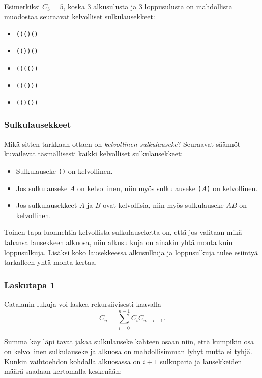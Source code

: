 Esimerkiksi $C_3=5$, koska 3 alkusulusta
ja 3 loppusulusta on mahdollista muodostaa
seuraavat kelvolliset sulkulausekkeet:

\begin{itemize}[noitemsep]
\item \texttt{()()()}
\item \texttt{(())()}
\item \texttt{()(())}
\item \texttt{((()))}
\item \texttt{(()())}
\end{itemize}

\subsubsection{Sulkulausekkeet}


Mikä sitten tarkkaan ottaen on
\textit{kelvollinen sulkulauseke}?
Seuraavat säännöt kuvailevat täsmällisesti
kaikki kelvolliset sulkulausekkeet:

\begin{itemize}
\item Sulkulauseke \texttt{()} on kelvollinen.
\item Jos sulkulauseke $A$ on kelvollinen,
niin myös sulkulauseke \texttt{(}$A$\texttt{)}
on kelvollinen.
\item Jos sulkulausekkeet $A$ ja $B$ ovat kelvollisia,
niin myös sulkulauseke $AB$ on kelvollinen.
\end{itemize}

Toinen tapa luonnehtia kelvollista sulkulauseketta on,
että jos valitaan mikä tahansa lausekkeen alkuosa,
niin alkusulkuja on ainakin yhtä monta
kuin loppusulkuja.
Lisäksi koko lausekkeessa alkusulkuja
ja loppusulkuja tulee esiintyä tarkalleen yhtä monta kertaa.

\subsubsection{Laskutapa 1}

Catalanin lukuja voi laskea rekursiivisesti kaavalla
\[ C_n = \sum_{i=0}^{n-1} C_{i} C_{n-i-1}.\]

Summa käy läpi tavat
jakaa sulkulauseke kahteen osaan niin,
että kumpikin osa on kelvollinen sulkulauseke
ja alkuosa on mahdollisimman lyhyt mutta ei tyhjä.
Kunkin vaihtoehdon kohdalla alkuosassa
on $i+1$ sulkuparia ja lausekkeiden määrä
saadaan kertomalla keskenään:

